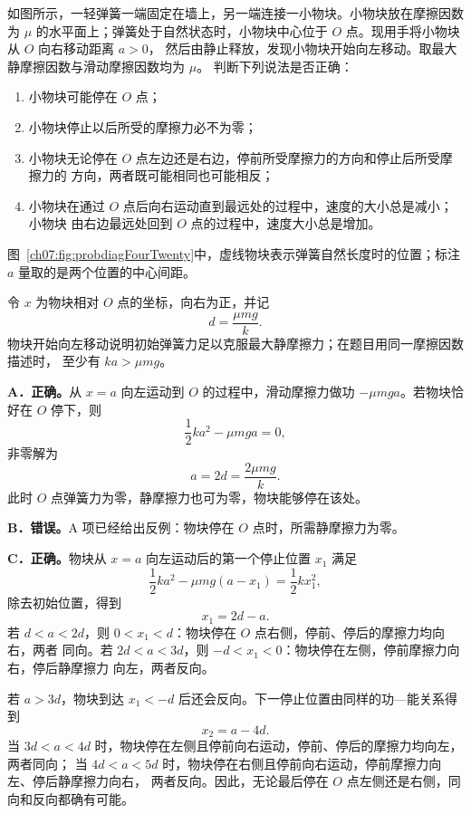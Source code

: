 {
\begin{origexamplebox}{}\label{ch07:ex:s12-4-20}
如图所示，一轻弹簧一端固定在墙上，另一端连接一小物块。小物块放在摩擦因数为 $\mu$
的水平面上；弹簧处于自然状态时，小物块中心位于 $O$ 点。现用手将小物块从 $O$ 向右移动距离 $a>0$，
然后由静止释放，发现小物块开始向左移动。取最大静摩擦因数与滑动摩擦因数均为 $\mu$。
判断下列说法是否正确：
\begin{enumerate}[label=\Alph*.,leftmargin=2.2em]
 \item 小物块可能停在 $O$ 点；
 \item 小物块停止以后所受的摩擦力必不为零；
 \item 小物块无论停在 $O$ 点左边还是右边，停前所受摩擦力的方向和停止后所受摩擦力的
 方向，两者既可能相同也可能相反；
 \item 小物块在通过 $O$ 点后向右运动直到最远处的过程中，速度的大小总是减小；小物块
 由右边最远处回到 $O$ 点的过程中，速度大小总是增加。
\end{enumerate}
图~\ref{ch07:fig:probdiagFourTwenty}中，虚线物块表示弹簧自然长度时的位置；标注 $a$ 量取的是两个位置的中心间距。
\probdiagFourTwenty
\end{origexamplebox}

\begin{xesolution}
令 $x$ 为物块相对 $O$ 点的坐标，向右为正，并记
\[
 d=\frac{\mu mg}{k}.
\]
物块开始向左移动说明初始弹簧力足以克服最大静摩擦力；在题目用同一摩擦因数描述时，
至少有 $ka>\mu mg$。

\textbf{A．正确。}\quad 从 $x=a$ 向左运动到 $O$ 的过程中，滑动摩擦力做功
$-\mu mga$。若物块恰好在 $O$ 停下，则
\[
 \frac12ka^2-\mu mga=0,
\]
非零解为
\[
 a=2d=\frac{2\mu mg}{k}.
\]
此时 $O$ 点弹簧力为零，静摩擦力也可为零，物块能够停在该处。

\textbf{B．错误。}\quad A 项已经给出反例：物块停在 $O$ 点时，所需静摩擦力为零。

\textbf{C．正确。}\quad 物块从 $x=a$ 向左运动后的第一个停止位置 $x_1$ 满足
\[
 \frac12ka^2-\mu mg(a-x_1)=\frac12kx_1^2,
\]
除去初始位置，得到
\[
 x_1=2d-a.
\]
若 $d<a<2d$，则 $0<x_1<d$：物块停在 $O$ 点右侧，停前、停后的摩擦力均向右，两者
同向。若 $2d<a<3d$，则 $-d<x_1<0$：物块停在左侧，停前摩擦力向右，停后静摩擦力
向左，两者反向。

若 $a>3d$，物块到达 $x_1<-d$ 后还会反向。下一停止位置由同样的功—能关系得到
\[
 x_2=a-4d.
\]
当 $3d<a<4d$ 时，物块停在左侧且停前向右运动，停前、停后的摩擦力均向左，两者同向；
当 $4d<a<5d$ 时，物块停在右侧且停前向右运动，停前摩擦力向左、停后静摩擦力向右，
两者反向。因此，无论最后停在 $O$ 点左侧还是右侧，同向和反向都确有可能。


\end{xesolution}}
